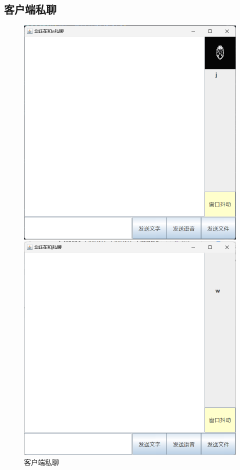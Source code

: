 \documentclass[UTF8,12pt]{article}
\begin{document}
\subsection{客户端私聊}
\begin{figure}[htbp]
    \centering
    \begin{minipage}{0.4\textwidth}
        \centering
        \includegraphics[width=1.0\textwidth]{img/23.png}
    \end{minipage}
    \begin{minipage}{0.4\textwidth}
        \centering
        \includegraphics[width=1.0\textwidth]{img/24.png}
    \end{minipage}
    \caption{客户端私聊}
\end{figure}
\end{document}
